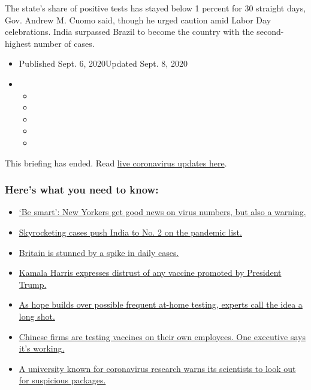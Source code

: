 The state's share of positive tests has stayed below 1 percent for 30
straight days, Gov. Andrew M. Cuomo said, though he urged caution amid
Labor Day celebrations. India surpassed Brazil to become the country
with the second-highest number of cases.

\begin{itemize}
\item
  Published Sept. 6, 2020Updated Sept. 8, 2020
\item
  \begin{itemize}
  \item
  \item
  \item
  \item
  \item
  \end{itemize}
\end{itemize}

This briefing has ended. Read
\href{https://www.nytimes3xbfgragh.onion/2020/09/08/world/covid-19-coronavirus.html}{live
coronavirus updates here}.

\hypertarget{heres-what-you-need-to-know}{%
\subsubsection{Here's what you need to
know:}\label{heres-what-you-need-to-know}}

\begin{itemize}
\tightlist
\item
  \protect\hyperlink{link-32da45cc}{`Be smart': New Yorkers get good
  news on virus numbers, but also a warning.}
\item
  \protect\hyperlink{link-5e4c215d}{Skyrocketing cases push India to No.
  2 on the pandemic list.}
\item
  \protect\hyperlink{link-38fff5b5}{Britain is stunned by a spike in
  daily cases.}
\item
  \protect\hyperlink{link-69b06270}{Kamala Harris expresses distrust of
  any vaccine promoted by President Trump.}
\item
  \protect\hyperlink{link-15f638e1}{As hope builds over possible
  frequent at-home testing, experts call the idea a long shot.}
\item
  \protect\hyperlink{link-7cc375a8}{Chinese firms are testing vaccines
  on their own employees. One executive says it's working.}
\item
  \protect\hyperlink{link-72bd89e3}{A university known for coronavirus
  research warns its scientists to look out for suspicious packages.}
\end{itemize}

